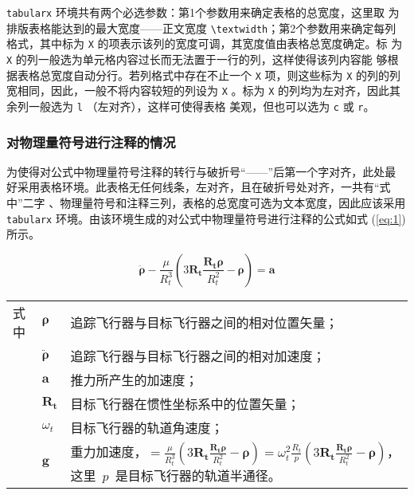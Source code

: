\texttt{tabularx} 环境共有两个必选参数：第1个参数用来确定表格的总宽度，这里取
为排版表格能达到的最大宽度——正文宽度 \verb|\textwidth|；第2个参数用来确定每列
格式，其中标为 \verb|X| 的项表示该列的宽度可调，其宽度值由表格总宽度确定。标
为 \verb|X| 的列一般选为单元格内容过长而无法置于一行的列，这样使得该列内容能
够根据表格总宽度自动分行。若列格式中存在不止一个 \verb|X| 项，则这些标为
\verb|X| 的列的列宽相同，因此，一般不将内容较短的列设为 \verb|X| 。标为
\verb|X| 的列均为左对齐，因此其余列一般选为 \verb|l| （左对齐），这样可使得表格
美观，但也可以选为 \verb|c| 或 \verb|r|。

\subsubsection{对物理量符号进行注释的情况}

为使得对公式中物理量符号注释的转行与破折号“——”后第一个字对齐，此处最
好采用表格环境。此表格无任何线条，左对齐，且在破折号处对齐，一共有“式中”二字
、物理量符号和注释三列，表格的总宽度可选为文本宽度，因此应该采用
\texttt{tabularx} 环境。由该环境生成的对公式中物理量符号进行注释的公式如式
(\ref{eq:1})所示。

\begin{equation}
\label{eq:1}
\ddot{\symbf{\rho}}-\frac{\mu}{R_t^3}\left(3\symbf{R_t}\frac{\symbf{R_t\rho}}{R_t^2}-\symbf{\rho}\right)=\symbf{a}
\end{equation}
\begin{flushleft}
\renewcommand\arraystretch{1.25}
\begin{tabularx}{\textwidth}{@{}>{\normalsize\rm}l@{\quad}>{\normalsize\rm}l@{——}>{\normalsize\rm}X@{}}
式中& $\symbf{\rho}$ &追踪飞行器与目标飞行器之间的相对位置矢量；\\
&  $\ddot{\symbf{\rho}}$&追踪飞行器与目标飞行器之间的相对加速度；\\
&  $\symbf{a}$   &推力所产生的加速度；\\
&  $\symbf{R_t}$ & 目标飞行器在惯性坐标系中的位置矢量；\\
&  $\omega_{t}$ & 目标飞行器的轨道角速度；\\
&  $\symbf{g}$ & 重力加速度，$=\frac{\mu}{R_{t}^{3}}\left(
3\symbf{R_{t}}\frac{\symbf{R_{t}\rho}}{R_{t}^{2}}-\symbf{\rho}\right)=\omega_{t}^{2}\frac{R_{t}}{p}\left(
3\symbf{R_{t}}\frac{\symbf{R_{t}\rho}}{R_{t}^{2}}-\symbf{\rho}\right)$，这里~$p$~是目标飞行器的轨道半通径。
\end{tabularx}\vspace{.5ex}%
\end{flushleft}

